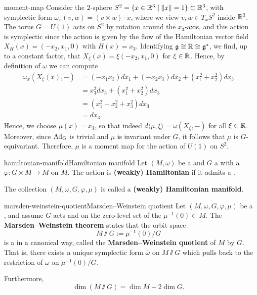 \begin{example}{moment-map}
    Consider the $2$-sphere $S^2 = \{ x \in \mathbb{R}^3 \mid \left\|x\right\| = 1 \} \subset \mathbb{R}^3$, with symplectic form $\omega_x(v, w) = (v \times w) \cdot x$, where we view $v, w \in T_x S^2$ inside $\mathbb{R}^3$. The torus $G = U(1)$ acts on $S^2$ by rotation around the $x_3$-axis, and this action is symplectic since the action is given by the flow of the Hamiltonian vector field $X_H(x) = (-x_2, x_1, 0)$ with $H(x) = x_3$. Identifying $\mathfrak{g} \cong \mathbb{R} \cong \mathfrak{g}^*$, we find, up to a constant factor, that $X_\xi(x) = \xi (-x_2, x_1, 0)$ for $\xi \in \mathbb{R}$. Hence, by definition of $\omega$ we can compute
    \[ \begin{aligned}
        \omega_x(X_\xi(x), -)
            &= (-x_1 x_3) dx_1 + (-x_2 x_3) dx_2 + (x_1^2 + x_2^2) dx_3 \\
            &= x_3^2 dx_3 + (x_1^2 + x_2^2) dx_3 \\
            &= (x_1^2 + x_2^2 + x_3^2) dx_3 \\
            &= dx_3 .
    \end{aligned} \]
    Hence, we choose $\mu(x) = x_3$, so that indeed $d \langle \mu, \xi \rangle = \omega(X_\xi, -)$ for all $\xi \in \mathbb{R}$. Moreover, since $\textup{Ad}_G$ is trivial and $\mu$ is invariant under $G$, it follows that $\mu$ is $G$-equivariant. Therefore, $\mu$ is a moment map for the action of $U(1)$ on $S^2$.
\end{example}

\begin{topic}{hamiltonian-manifold}{Hamiltonian manifold}
    Let $(M, \omega)$ be a  and $G$ a  with a  $\varphi : G \times M \to M$ on $M$. The action is \textbf{(weakly) Hamiltonian} if it admits a .
    
    The collection $(M, \omega, G, \varphi, \mu)$ is called a \textbf{(weakly) Hamiltonian manifold}.
\end{topic}

\begin{topic}{marsden-weinstein-quotient}{Marsden--Weinstein quotient}
    Let $(M, \omega, G, \varphi, \mu)$ be a , and assume $G$ acts  and  on the zero-level set of the  $\mu^{-1}(0) \subset M$. The \textbf{Marsden--Weinstein theorem} states that the orbit space
    \[ M \sslash G := \mu^{-1}(0) / G \]
    is a  in a canonical way, called the \textbf{Marsden--Weinstein quotient} of $M$ by $G$. That is, there exists a unique symplectic form $\overline{\omega}$ on $M \sslash G$ which pulls back to the restriction of $\omega$ on $\mu^{-1}(0) / G$.
    
    Furthermore,
    \[ \dim(M \sslash G) = \dim M - 2 \dim G . \]
\end{topic}

